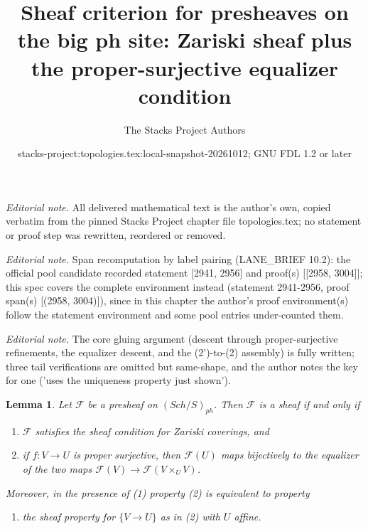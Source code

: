 \documentclass[10pt,a4paper]{amsart}
\title{Sheaf criterion for presheaves on the big ph site: Zariski sheaf plus the proper-surjective equalizer condition}
\author{The Stacks Project Authors}
\date{stacks-project:topologies.tex:local-snapshot-20261012; GNU FDL 1.2 or later}
\theoremstyle{plain}
\newtheorem{lemma}[subsection]{Lemma}
\theoremstyle{definition}
\theoremstyle{remark}
\numberwithin{equation}{subsection}
\def\Sch{\mathit{Sch}}
\begin{document}
\maketitle
\noindent\textit{Editorial note.} All delivered mathematical text is the author's own, copied verbatim from the pinned Stacks Project chapter file topologies.tex; no statement or proof step was rewritten, reordered or removed.\par\medskip
\noindent\textit{Editorial note.} Span recomputation by label pairing (LANE\_BRIEF 10.2): the official pool candidate recorded statement [2941, 2956] and proof(s) [[2958, 3004]]; this spec covers the complete environment instead (statement 2941-2956, proof span(s) [(2958, 3004)]), since in this chapter the author's proof environment(s) follow the statement environment and some pool entries under-counted them.\par\medskip
\noindent\textit{Editorial note.} The core gluing argument (descent through proper-surjective refinements, the equalizer descent, and the (2')-to-(2) assembly) is fully written; three tail verifications are omitted but same-shape, and the author notes the key for one ('uses the uniqueness property just shown').\par\medskip
\begin{lemma}
\label{lemma-characterize-sheaf}
Let $\mathcal{F}$ be a presheaf on $(\Sch/S)_{ph}$.
Then $\mathcal{F}$ is a sheaf if and only if
\begin{enumerate}
\item $\mathcal{F}$ satisfies the sheaf condition for
Zariski coverings, and
\item if $f : V \to U$ is proper surjective, then
$\mathcal{F}(U)$ maps bijectively to the equalizer
of the two maps $\mathcal{F}(V) \to \mathcal{F}(V \times_U V)$.
\end{enumerate}
Moreover, in the presence of (1) property (2) is equivalent to property
\begin{enumerate}
\item[(2')] the sheaf property for $\{V \to U\}$ as in (2) with $U$ affine.
\end{enumerate}
\end{lemma}
\end{document}
